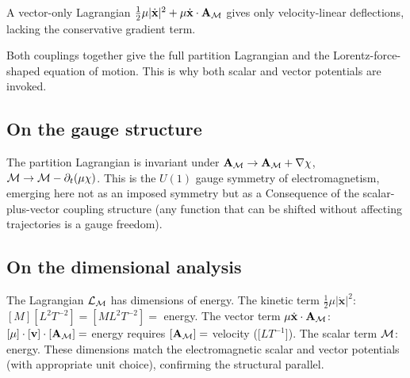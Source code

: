 A vector-only Lagrangian $\tfrac{1}{2}\mu|\dot{\mathbf{x}}|^{2}+\mu\dot{\mathbf{x}}\cdot\mathbf{A}_{\mathcal{M}}$ gives only velocity-linear deflections, lacking the conservative gradient term.

Both couplings together give the full partition Lagrangian and the Lorentz-force-shaped equation of motion. This is why both scalar and vector potentials are invoked.

\subsection{On the gauge structure}

The partition Lagrangian is invariant under $\mathbf{A}_{\mathcal{M}}\to\mathbf{A}_{\mathcal{M}}+\nabla\chi$, $\mathcal{M}\to\mathcal{M}-\partial_{t}(\mu\chi)$. This is the $U(1)$ gauge symmetry of electromagnetism, emerging here not as an imposed symmetry but as a Consequence of the scalar-plus-vector coupling structure (any function that can be shifted without affecting trajectories is a gauge freedom).

\subsection{On the dimensional analysis}

The Lagrangian $\mathcal{L}_{\mathcal{M}}$ has dimensions of energy. The kinetic term $\tfrac{1}{2}\mu|\dot{\mathbf{x}}|^{2}$: $[M][L^{2}T^{-2}]=[M L^{2} T^{-2}]=$ energy. The vector term $\mu\dot{\mathbf{x}}\cdot\mathbf{A}_{\mathcal{M}}$: $[\mu]\cdot[\mathbf{v}]\cdot[\mathbf{A}_{\mathcal{M}}]=$ energy requires $[\mathbf{A}_{\mathcal{M}}]=$ velocity ([$LT^{-1}$]). The scalar term $\mathcal{M}$: energy. These dimensions match the electromagnetic scalar and vector potentials (with appropriate unit choice), confirming the structural parallel.

\clearpage

